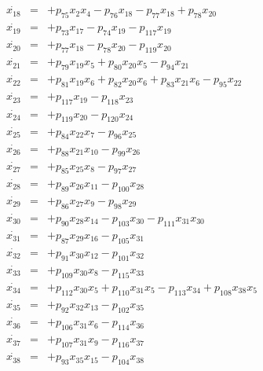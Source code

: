 \documentclass{article}
\begin{document}
\begin{eqnarray*}
\dot{x_{18}}&=&  + p_{75} x_{2} x_{4} - p_{76} x_{18} - p_{77} x_{18} + p_{78} x_{20}
\\
\dot{x_{19}}&=&  + p_{73} x_{17} - p_{74} x_{19} - p_{117} x_{19}
\\
\dot{x_{20}}&=&  + p_{77} x_{18} - p_{78} x_{20} - p_{119} x_{20}
\\
\dot{x_{21}}&=&  + p_{79} x_{19} x_{5} + p_{80} x_{20} x_{5} - p_{94} x_{21}
\\
\dot{x_{22}}&=&  + p_{81} x_{19} x_{6} + p_{82} x_{20} x_{6} + p_{83} x_{21} x_{6} - p_{95} x_{22}
\\
\dot{x_{23}}&=&  + p_{117} x_{19} - p_{118} x_{23}
\\
\dot{x_{24}}&=&  + p_{119} x_{20} - p_{120} x_{24}
\\
\dot{x_{25}}&=&  + p_{84} x_{22} x_{7} - p_{96} x_{25}
\\
\dot{x_{26}}&=&  + p_{88} x_{21} x_{10} - p_{99} x_{26}
\\
\dot{x_{27}}&=&  + p_{85} x_{25} x_{8} - p_{97} x_{27}
\\
\dot{x_{28}}&=&  + p_{89} x_{26} x_{11} - p_{100} x_{28}
\\
\dot{x_{29}}&=&  + p_{86} x_{27} x_{9} - p_{98} x_{29}
\\
\dot{x_{30}}&=&  + p_{90} x_{28} x_{14} - p_{103} x_{30} - p_{111} x_{31} x_{30}
\\
\dot{x_{31}}&=&  + p_{87} x_{29} x_{16} - p_{105} x_{31}
\\
\dot{x_{32}}&=&  + p_{91} x_{30} x_{12} - p_{101} x_{32}
\\
\dot{x_{33}}&=&  + p_{109} x_{30} x_{8} - p_{115} x_{33}
\\
\dot{x_{34}}&=&  + p_{112} x_{30} x_{5} + p_{110} x_{31} x_{5} - p_{113} x_{34} + p_{108} x_{38} x_{5}
\\
\dot{x_{35}}&=&  + p_{92} x_{32} x_{13} - p_{102} x_{35}
\\
\dot{x_{36}}&=&  + p_{106} x_{31} x_{6} - p_{114} x_{36}
\\
\dot{x_{37}}&=&  + p_{107} x_{31} x_{9} - p_{116} x_{37}
\\
\dot{x_{38}}&=&  + p_{93} x_{35} x_{15} - p_{104} x_{38}
\\
\end{eqnarray*}
\end{document}
